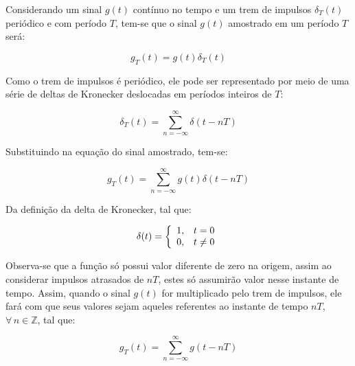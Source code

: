 Considerando um sinal $g(t)$ contínuo no tempo e um trem de impulsos $\delta_T(t)$ periódico e com período $T$, tem-se que o sinal $g(t)$ amostrado em um período $T$ será:

\begin{equation}
    g_T(t) = g(t)\delta_T(t)
\end{equation}

Como o trem de impulsos é periódico, ele pode ser representado por meio de uma série de deltas de Kronecker deslocadas em períodos inteiros de $T$:

\begin{equation}
    \delta_T(t) = \sum_{n = -\infty}^{\infty} \delta(t-nT)
\end{equation}

Substituindo na equação do sinal amostrado, tem-se:

\begin{equation}
     g_T(t) = \sum_{n = -\infty}^{\infty} g(t)\delta(t-nT)
\end{equation}

Da definição da delta de Kronecker, tal que:

\begin{equation} 
\centering
\delta(t) =
\left \{
\begin{array}{cc}
1, & t=0 \\
0, & t\neq0
\end{array}
\right.
\end{equation}

Observa-se que a função só possui valor diferente de zero na origem, assim ao considerar impulsos atrasados de $nT$, estes só assumirão valor nesse instante de tempo. Assim, quando o sinal $g(t)$ for multiplicado pelo trem de impulsos, ele fará com que seus valores sejam aqueles referentes ao instante de tempo $nT$, $\forall \, n \in \mathbb{Z} $, tal que:

\begin{equation}
     g_T(t) = \sum_{n = -\infty}^{\infty} g(t-nT)
\end{equation}